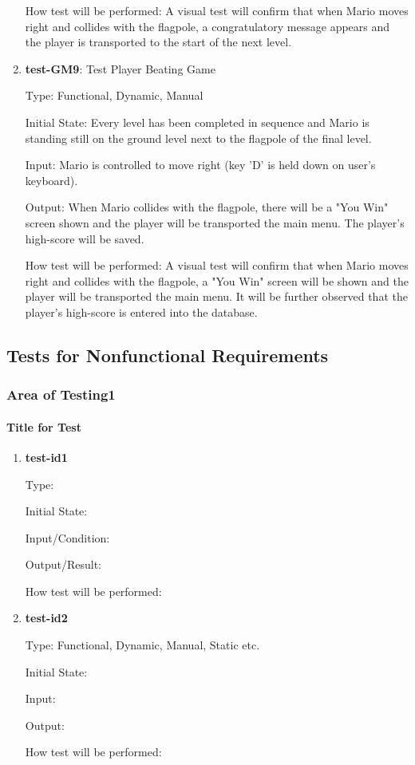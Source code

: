 \documentclass[12pt, titlepage]{article}
\begin{document}
\begin{enumerate}
How test will be performed: A visual test will confirm that when Mario moves right and collides with the flagpole, a congratulatory message appears and the player is transported to the start of the next level.

\item{\textbf{test-GM9}: Test Player Beating Game\\}

Type: Functional, Dynamic, Manual

Initial State: Every level has been completed in sequence and Mario is standing still on the ground level next to the flagpole of the final level.

Input: Mario is controlled to move right (key 'D' is held down on user's keyboard).

Output: When Mario collides with the flagpole, there will be a "You Win" screen shown and the player will be transported the main menu. The player's high-score will be saved.

How test will be performed: A visual test will confirm that when Mario moves right and collides with the flagpole, a "You Win" screen will be shown and the player will be transported the main menu. It will be further observed that the player's high-score is entered into the database.

\end{enumerate}

\subsection{Tests for Nonfunctional Requirements}

\subsubsection{Area of Testing1}

\paragraph{Title for Test}

\begin{enumerate}

\item{\textbf{test-id1\\}}

Type:

Initial State:

Input/Condition:

Output/Result:

How test will be performed:

\item{\textbf{test-id2\\}}

Type: Functional, Dynamic, Manual, Static etc.

Initial State:

Input:

Output:

How test will be performed:

\end{enumerate}
\end{document}
